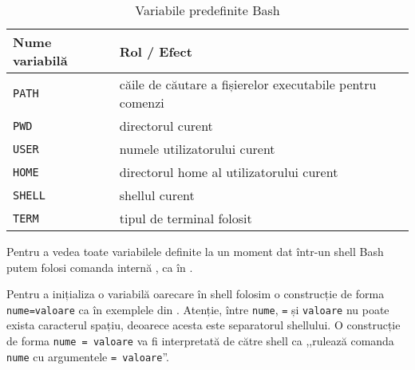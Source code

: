 \begin{table}[!htb]
  \caption{Variabile predefinite Bash}
  \begin{center}
    \begin{tabular}{ p{} p{} }
      \toprule
        \textbf{Nume variabilă} &
        \textbf{Rol / Efect} \\
      \midrule
        \texttt{PATH} &
        căile de căutare a fișierelor executabile pentru comenzi \\

        \texttt{PWD} &
        directorul curent \\

        \texttt{USER} &
        numele utilizatorului curent \\

        \texttt{HOME} &
        directorul home al utilizatorului curent \\

        \texttt{SHELL} &
        shellul curent \\

        \texttt{TERM} &
        tipul de terminal folosit \\
      \bottomrule
    \end{tabular}
    \label{tab:cli:shell-vars}
  \end{center}
\end{table}

Pentru a vedea toate variabilele definite la un moment dat într-un shell Bash
putem folosi comanda internă , ca în .


Pentru a inițializa o variabilă oarecare în shell folosim o construcție de forma
\texttt{nume=valoare} ca în exemplele din .
Atenție, între \texttt{nume}, \texttt{=} și \texttt{valoare} nu poate exista caracterul spațiu, deoarece acesta este separatorul shellului.
O construcție de forma \texttt{nume = valoare} va fi interpretată de către shell ca ,,rulează comanda \texttt{nume} cu argumentele \texttt{= valoare}''.

